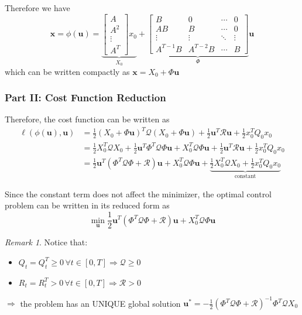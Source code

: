 \documentclass[openany]{book}
\theoremstyle{definition}
\theoremstyle{remark}
\newtheorem*{remark}{Remark}
\begin{document}
Therefore we have
\[
\mathbf{x} = \phi(\mathbf{u}) = \underbrace{\begin{bmatrix}
A \\ A^2 \\ \vdots \\ A^T
\end{bmatrix}x_0}_{X_0} + \underbrace{\begin{bmatrix}
B & 0 & \cdots & 0 \\
AB & B & \cdots & 0 \\
\vdots & \vdots & \ddots & \vdots \\
A^{T-1}B & A^{T-2}B & \cdots & B
\end{bmatrix}}_{\Phi}\mathbf{u}
\]
which can be written compactly as $\mathbf{x} = X_0 + \Phi\mathbf{u}$

\subsubsection{Part II: Cost Function Reduction}
Therefore, the cost function can be written as
\begin{align*}
\ell(\phi(\mathbf{u}), \mathbf{u}) &= \frac{1}{2}(X_0 + \Phi\mathbf{u})^T \mathcal{Q}(X_0 + \Phi\mathbf{u}) + \frac{1}{2}\mathbf{u}^T \mathcal{R}\mathbf{u} + \frac{1}{2}x_0^T Q_0x_0 \\
&= \frac{1}{2}X_0^T \mathcal{Q}X_0 + \frac{1}{2}\mathbf{u}^T \Phi^T \mathcal{Q}\Phi\mathbf{u} + X_0^T \mathcal{Q}\Phi\mathbf{u} + \frac{1}{2}\mathbf{u}^T \mathcal{R}\mathbf{u} + \frac{1}{2}x_0^T Q_0x_0 \\
&= \frac{1}{2}\mathbf{u}^T (\Phi^T \mathcal{Q}\Phi + \mathcal{R})\mathbf{u} + X_0^T \mathcal{Q}\Phi\mathbf{u} + \underbrace{\frac{1}{2}X_0^T \mathcal{Q}X_0 + \frac{1}{2}x_0^T Q_0x_0}_{\text{constant}}
\end{align*}

Since the constant term does not affect the minimizer, the optimal control problem can be written in its reduced form as
\[
\min_{\mathbf{u}} \frac{1}{2}\mathbf{u}^T (\Phi^T \mathcal{Q}\Phi + \mathcal{R})\mathbf{u} + X_0^T \mathcal{Q}\Phi\mathbf{u}
\]

\begin{remark}
Notice that:
\begin{itemize}
    \item $Q_t = Q_t^T \geq 0 \,\forall t\in[0,T] \Rightarrow \mathcal{Q} \geq 0$
    \item $R_t = R_t^T > 0 \,\forall t\in[0,T] \Rightarrow \mathcal{R} > 0$
\end{itemize}
$\Rightarrow$ the problem has an UNIQUE global solution $\mathbf{u}^* = -\frac{1}{2}(\Phi^T\mathcal{Q}\Phi+\mathcal{R})^{-1}\Phi^T\mathcal{Q}X_0$
\end{remark}
\end{document}
